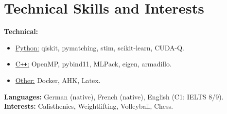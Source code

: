\documentclass[10pt,a4paper,roman]{moderncv}        %
\makeatletter
\newcommand*{\customcventry}[5][.5em]{
  \begin{tabular}{@{}l} 
    {\bfseries #2}
  \end{tabular}
  \hfill%
  \begin{tabular}{l@{}}
     { #3}
  \end{tabular} \\
  \begin{tabular}{@{}l} 
    {\itshape\small #4}
  \end{tabular}
  \ifx&#5&%
  \else{\\%
    \begin{minipage}{0.82\maincolumnwidth}%
      \small#5%
    \end{minipage}}\fi%
  \par\addvspace{#1}}
\makeatother
\begin{document}










\section{Technical Skills and Interests}
\textbf{Technical:}
\begin{itemize}
\item \underline{Python:} qiskit, pymatching, stim, scikit-learn, CUDA-Q.
\item \underline{C\texttt{++}:} OpenMP, pybind11, MLPack, eigen, armadillo.
\item\underline{Other:} Docker, AHK, Latex.
\end{itemize}
\vspace*{0.1cm}
\textbf{Languages:} German (native), French (native), English (C1: IELTS 8/9).
\\
\textbf{Interests:} Calisthenics, Weightlifting, Volleyball, Chess.
\end{document}
